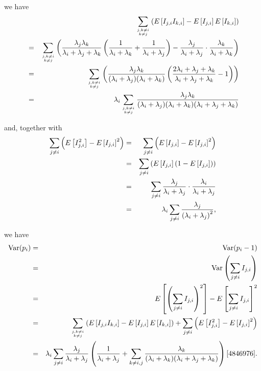 \documentclass{article}
\DeclareMathOperator{\Var}{Var}
\begin{document}
\begin{enumerate}
\begin{enumerate}
    we have
    \begin{eqnarray*}
    &&
    \sum_{j,k\ne i\atop k\ne j}\left(E\left[I_{j,i}I_{k,i}\right]-E\left[I_{j,i}\right]E\left[I_{k,i}\right]\right)
    \\
    &=&
    \sum_{j,k\ne i\atop k\ne j}\left(\frac{\lambda_j\lambda_k}{\lambda_i+\lambda_j+\lambda_k}\left(\frac1{\lambda_i+\lambda_k}+\frac1{\lambda_i+\lambda_j}\right)-\frac{\lambda_j}{\lambda_i+\lambda_j}\cdot\frac{\lambda_k}{\lambda_i+\lambda_k}\right)
    \\
    &=&
    \sum_{j,k\ne i\atop k\ne j}\left(\frac{\lambda_j\lambda_k}{(\lambda_i+\lambda_j)(\lambda_i+\lambda_k)}\left(\frac{2\lambda_i+\lambda_j+\lambda_k}{\lambda_i+\lambda_j+\lambda_k}-1\right)\right)
    \\
    &=&
    \lambda_i\sum_{j,k\ne i\atop k\ne j}\frac{\lambda_j\lambda_k}{(\lambda_i+\lambda_j)(\lambda_i+\lambda_k)(\lambda_i+\lambda_j+\lambda_k)}
    \end{eqnarray*}

    and, together with
    \begin{eqnarray*}
    \sum_{j\ne i}\left(E\left[I_{j,i}^2\right]-E\left[I_{j,i}\right]^2\right)
    &=&
    \sum_{j\ne i}\left(E\left[I_{j,i}\right]-E\left[I_{j,i}\right]^2\right)
    \\
    &=&
    \sum_{j\ne i}\left(E\left[I_{j,i}\right]\left(1-E\left[I_{j,i}\right]\right)\right)
    \\
    &=&
    \sum_{j\ne i}\frac{\lambda_j}{\lambda_i+\lambda_j}\cdot\frac{\lambda_i}{\lambda_i+\lambda_j}
    \\
    &=&
    \lambda_i\sum_{j\ne i}\frac{\lambda_j}{\left(\lambda_i+\lambda_j\right)^2}\text,
    \end{eqnarray*}

    we have
    \begin{eqnarray*}
    \Var(p_i)
    &=&
    \Var(p_i-1)
    \\
    &=&
    \Var\left(\sum_{j\ne i}I_{j,i}\right)
    \\
    &=&
    E\left[\left(\sum_{j\ne i}I_{j,i}\right)^2\right]- E\left[\sum_{j\ne i}I_{j,i}\right]^2
    \\
    &=&
    \sum_{j,k\ne i\atop k\ne j}\left(E\left[I_{j,i}I_{k,i}\right]- E\left[I_{j,i}\right] E\left[I_{k,i}\right]\right)+\sum_{j\ne i}\left(E\left[I_{j,i}^2\right]-E\left[I_{j,i}\right]^2\right)
    \\
    &=&
    \lambda_i\sum_{j\ne i}\frac{\lambda_j}{\lambda_i+\lambda_j}\left(\frac1{\lambda_i+\lambda_j}+\sum_{k\ne i,j}\frac{\lambda_k}{(\lambda_i+\lambda_k)(\lambda_i+\lambda_j+\lambda_k)}\right)\cite{4846976}\text.
    \end{eqnarray*}
    \end{enumerate}
\end{enumerate}

{}

\end{document}
